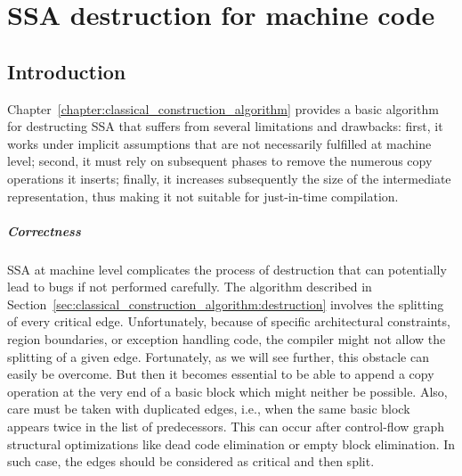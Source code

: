 \chapter{SSA destruction for machine code }


\label{chapter:alternative_ssa_destruction_algorithm}


\section{Introduction}
Chapter~\ref{chapter:classical_construction_algorithm} provides a basic algorithm for destructing SSA that suffers from several limitations and drawbacks: 
first, it works under implicit assumptions that are not necessarily fulfilled at machine level; 
second, it must rely on subsequent phases to remove the numerous copy operations it inserts; 
finally, it increases subsequently the size of the intermediate representation, thus making it not suitable for just-in-time compilation.

\paragraph{Correctness}
SSA at machine level complicates the process of destruction that can potentially lead to bugs if not performed carefully. 
The algorithm described in Section~\ref{sec:classical_construction_algorithm:destruction} involves the splitting of every critical edge. 
Unfortunately, because of specific architectural constraints, region boundaries, or exception handling code, the compiler might not allow the splitting of a given edge. 
Fortunately, as we will see further, this obstacle can easily be overcome. 
But then it becomes essential to be able to append a copy operation at the very end of a basic block which might neither be possible. 
Also, care must be taken with duplicated edges, i.e., when the same basic block appears twice in the list of predecessors. 
This can occur after control-flow graph structural optimizations like dead code elimination or empty block elimination. 
In such case, the edges should be considered as critical and then split.

